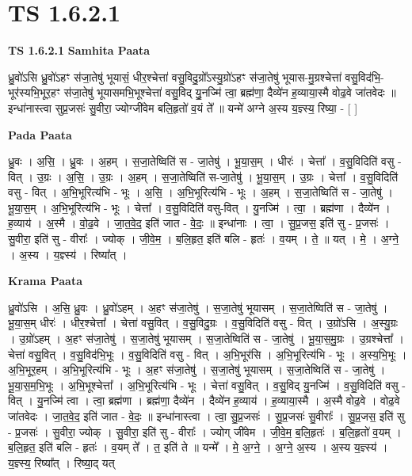 \documentclass[17pt]{extarticle}
\begin{document}
\section*{ TS 1.6.2.1 }

\textbf{TS 1.6.2.1 } \newline
\textbf{Samhita Paata} \newline

ध्रु॒वो॑ऽसि ध्रु॒वो॑ऽहꣳ स॑जा॒तेषु॑ भूयासं॒ धीर॒श्चेत्ता॑ वसु॒विदु॒ग्रो᳚ऽस्यु॒ग्रो॑ऽहꣳ स॑जा॒तेषु॑ भूयास-मु॒ग्रश्चेत्ता॑ वसु॒विद॑भि॒-भूर॑स्यभि॒भूर॒हꣳ स॑जा॒तेषु॑ भूयासमभि॒भूश्चेत्ता॑ वसु॒विद् यु॒॒नज्मि॑ त्वा॒ ब्रह्म॑णा॒ दैव्ये॑न ह॒व्याया॒स्मै वोढ॒वे जा॑तवेदः ॥ इन्धा॑नास्त्वा सुप्र॒जसः॑ सु॒वीरा॒ ज्योग्जी॑वेम बलि॒हृतो॑ व॒यं ते᳚ ॥ यन्मे॑ अग्ने अ॒स्य य॒ज्ञ्स्य॒ रिष्या॒ - [ ] \newline

\textbf{Pada Paata} \newline

ध्रु॒वः । अ॒सि॒ । ध्रु॒वः । अ॒हम् । स॒जा॒तेष्विति॑ स - जा॒तेषु॑ । भू॒या॒स॒म् । धीरः॑ । चेत्ता᳚ । व॒सु॒विदिति॑ वसु - वित् । उ॒ग्रः । अ॒सि॒ । उ॒ग्रः । अ॒हम् । स॒जा॒तेष्विति॑ स-जा॒तेषु॑ । भू॒या॒स॒म् । उ॒ग्रः । चेत्ता᳚ । व॒सु॒विदिति॑ वसु - वित् । अ॒भि॒भूरित्य॑भि - भूः । अ॒सि॒ । अ॒भि॒भूरित्य॑भि - भूः । अ॒हम् । स॒जा॒तेष्विति॑ स - जा॒तेषु॑ । भू॒या॒स॒म् । अ॒भि॒भूरित्य॑भि - भूः । चेत्ता᳚ । व॒सु॒विदिति॑ वसु-वित् । यु॒नज्मि॑ । त्वा॒ । ब्रह्म॑णा । दैव्ये॑न । ह॒व्याय॑ । अ॒स्मै । वो॒ढ॒वे । जा॒त॒वे॒द॒ इति॑ जात - वे॒दः॒ ॥ इन्धा॑नाः । त्वा॒ । सु॒प्र॒जस॒ इति॑ सु - प्र॒जसः॑ । सु॒वीरा॒ इति॑ सु - वीराः᳚ । ज्योक् । जी॒वे॒म॒ । ब॒लि॒हृत॒ इति॑ बलि - हृतः॑ । व॒यम् । ते॒ ॥ यत् । मे॒ । अ॒ग्ने॒ । अ॒स्य । य॒ज्ञ्स्य॑ । रिष्या᳚त् ।  \newline


\textbf{Krama Paata} \newline

ध्रु॒वो॑ऽसि । अ॒सि॒ ध्रु॒वः । ध्रु॒वो॑ऽहम् । अ॒हꣳ स॑जा॒तेषु॑ । स॒जा॒तेषु॑ भूयासम् । स॒जा॒तेष्विति॑ स - जा॒तेषु॑ । भू॒या॒स॒म् धीरः॑ । धीर॒श्चेत्ता᳚ । चेत्ता॑ वसु॒वित् । व॒सु॒विदु॒ग्रः । व॒सु॒विदिति॑ वसु - वित् । उ॒ग्रो॑ऽसि । अ॒स्यु॒ग्रः । उ॒ग्रो॑ऽहम् । अ॒हꣳ स॑जा॒तेषु॑ । स॒जा॒तेषु॑ भूयासम् । स॒जा॒तेष्विति॑ स - जा॒तेषु॑ । भू॒या॒स॒मु॒ग्रः । उ॒ग्रश्चेत्ता᳚ । चेत्ता॑ वसु॒वित् । व॒सु॒विद॑भि॒भूः । व॒सु॒विदिति॑ वसु - वित् । अ॒भि॒भूर॑सि । अ॒भि॒भूरित्य॑भि - भूः । अ॒स्य॒भि॒भूः । अ॒भि॒भूर॒हम् । अ॒भि॒भूरित्य॑भि - भूः । अ॒हꣳ स॑जा॒तेषु॑ । स॒जा॒तेषु॑ भूयासम् । स॒जा॒तेष्विति॑ स - जा॒तेषु॑ । भू॒या॒स॒म॒भि॒भूः । अ॒भि॒भूश्चेत्ता᳚ । अ॒भि॒भूरित्य॑भि - भूः । चेत्ता॑ वसु॒वित् । व॒सु॒विद् यु॒नज्मि॑ । व॒सु॒विदिति॑ वसु - वित् । यु॒नज्मि॑ त्वा । त्वा॒ ब्रह्म॑णा । ब्रह्म॑णा॒ दैव्ये॑न । दैव्ये॑न ह॒व्याय॑ । ह॒व्याया॒स्मै । अ॒स्मै वोढ॒वे । वोढ॒वे जा॑तवेदः । जा॒त॒वे॒द॒ इति॑ जात - वे॒दः॒ ॥ इन्धा॑नास्त्वा । त्वा॒ सु॒प्र॒जसः॑ । सु॒प्र॒जसः॑ सु॒वीराः᳚ । सु॒प्र॒जस॒ इति॑ सु - प्र॒जसः॑ । सु॒वीरा॒ ज्योक् । सु॒वीरा॒ इति॑ सु - वीराः᳚ । ज्योग् जी॑वेम । जी॒वे॒म॒ ब॒लि॒हृतः॑ । ब॒लि॒हृतो॑ व॒यम् । ब॒लि॒हृत॒ इति॑ बलि - हृतः॑ । व॒यम् ते᳚ । त॒ इति॑ ते ॥ यन्मे᳚ । मे॒ अ॒ग्ने॒ । अ॒ग्ने॒ अ॒स्य । अ॒स्य य॒ज्ञ्स्य॑ । य॒ज्ञ्स्य॒ रिष्या᳚त् । रिष्या॒द् यत् \newline
\end{document}
